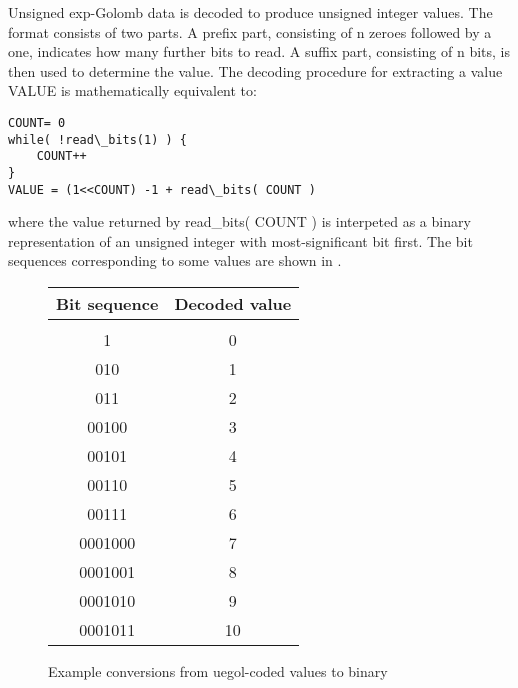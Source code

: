 Unsigned exp-Golomb data is decoded to produce unsigned integer values.
The format consists of two parts. A prefix part, consisting of n zeroes
followed by a one, indicates how many further bits to read. A suffix
part, consisting of n bits, is then used to determine the value. The
decoding procedure for extracting a value VALUE is mathematically
equivalent to:

\begin{verbatim}
COUNT= 0
while( !read\_bits(1) ) {
    COUNT++
}
VALUE = (1<<COUNT) -1 + read\_bits( COUNT )
\end{verbatim}

where the value returned by read\_bits( COUNT ) is interpeted as a binary
representation of an unsigned integer with most-significant bit first.
The bit sequences corresponding to some values are shown in  .

\begin{figure}[h]
\begin{tabular}{c|c}
Bit sequence & Decoded value \\
\hline\\
1       &  0\\
010     &  1\\
011     &  2\\
00100   &  3\\
00101   &  4\\
00110   &  5\\
00111   &  6\\
0001000 &  7\\
0001001 &  8\\
0001010 &  9\\
0001011 & 10
\end{tabular}

\caption{Example conversions from uegol-coded values to binary}
\end{figure}



